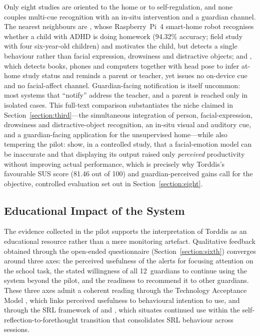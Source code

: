 Only eight studies are oriented to the home or to self-regulation, and none couples multi-cue recognition with an in-situ intervention and a guardian channel. The nearest neighbours are \citet{Berrezuetaguzman2023Artificial}, whose Raspberry~Pi~4 smart-home robot recognises whether a child with ADHD is doing homework (94.32\% accuracy; field study with four six-year-old children) and motivates the child, but detects a single behaviour rather than facial expression, drowsiness and distractive objects; and \citet{Huang2021Student}, which detects books, phones and computers together with head pose to infer at-home study status and reminds a parent or teacher, yet issues no on-device cue and no facial-affect channel. Guardian-facing notification is itself uncommon: most systems that ``notify'' address the teacher, and a parent is reached only in isolated cases. This full-text comparison substantiates the niche claimed in Section~\ref{section:third}---the simultaneous integration of person, facial-expression, drowsiness and distractive-object recognition, an in-situ visual and auditory cue, and a guardian-facing application for the unsupervised home---while also tempering the pilot: \citet{Prince2024Investigating} show, in a controlled study, that a facial-emotion model can be inaccurate and that displaying its output raised only \emph{perceived} productivity without improving actual performance, which is precisely why Torddis's favourable SUS score (81.46 out of 100) and guardian-perceived gains call for the objective, controlled evaluation set out in Section~\ref{section:eight}.

\subsection{Educational Impact of the System}
The evidence collected in the pilot supports the interpretation of Torddis as an educational resource rather than a mere monitoring artefact. Qualitative feedback obtained through the open-ended questionnaire (Section~\ref{section:sixth}) converges around three axes: the perceived usefulness of the alerts for focusing attention on the school task, the stated willingness of all 12~guardians to continue using the system beyond the pilot, and the readiness to recommend it to other guardians. These three axes admit a coherent reading through the Technology Acceptance Model \citep{Davis1989Management}, which links perceived usefulness to behavioural intention to use, and through the SRL framework of \citet{Zimmerman2000Attaining} and \citet{Panadero2017Review}, which situates continued use within the self-reflection-to-forethought transition that consolidates SRL behaviour across sessions.

